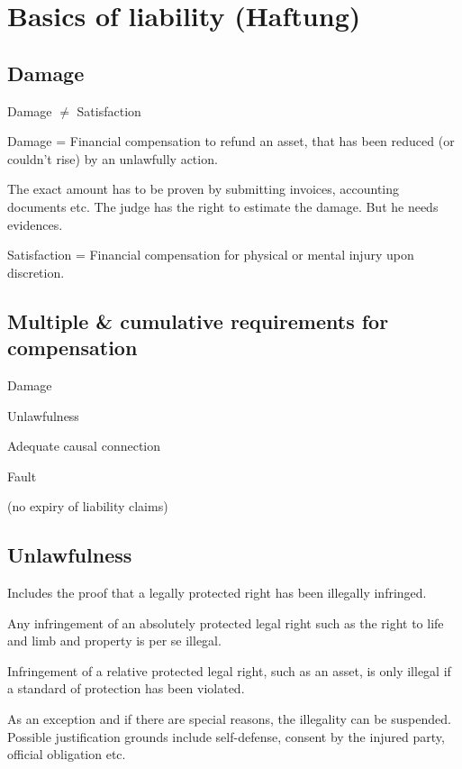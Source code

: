 \section{Basics of liability (Haftung)}
\subsection{Damage}
\begin{compactitem}
	\item Damage $\neq$ Satisfaction
	\item Damage = Financial compensation to refund an asset, that has been reduced (or couldn’t rise) by an unlawfully action.
	\item The exact amount has to be proven by submitting invoices, accounting documents etc. The judge has the right to estimate the damage. But he needs evidences.
	\item Satisfaction = Financial compensation for physical or mental injury upon discretion.
\end{compactitem}

\subsection{Multiple \& cumulative requirements for compensation}
\begin{compactenum}
	\item Damage
	\item Unlawfulness
	\item Adequate causal connection
	\item Fault
	\item (no expiry of liability claims)
\end{compactenum}

\subsection{Unlawfulness}
\begin{compactitem}
	\item Includes the proof that a legally protected right has been illegally infringed.
	\item Any infringement of an absolutely protected legal right such as the right to life and limb and property is per se illegal.
	\item Infringement of a relative protected legal right, such as an asset, is only illegal if a standard of protection has been violated.
	\item As an exception and if there are special reasons, the illegality can be suspended. Possible justification grounds include self-defense, consent by the injured party, official obligation etc.
\end{compactitem}

